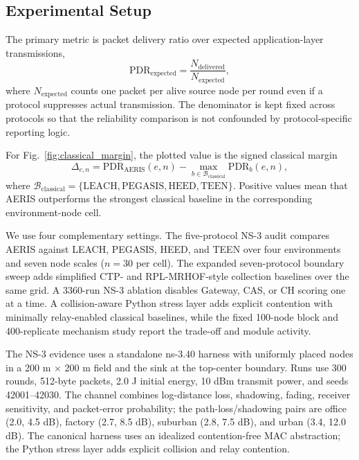 \documentclass[conference]{IEEEtran}
\begin{document}
\subsection{Experimental Setup}
The primary metric is packet delivery ratio over expected application-layer transmissions,
\begin{equation}
\mathrm{PDR}_{\mathrm{expected}}=\frac{N_{\mathrm{delivered}}}{N_{\mathrm{expected}}},
\end{equation}
where $N_{\mathrm{expected}}$ counts one packet per alive source node per round even if a protocol suppresses actual transmission. The denominator is kept fixed across protocols so that the reliability comparison is not confounded by protocol-specific reporting logic.

For Fig.~\ref{fig:classical_margin}, the plotted value is the signed classical margin
\begin{equation}
\Delta_{e,n}=\mathrm{PDR}_{\mathrm{AERIS}}(e,n)-\max_{b\in\mathcal{B}_{\mathrm{classical}}}\mathrm{PDR}_b(e,n),
\end{equation}
where $\mathcal{B}_{\mathrm{classical}}=\{\mathrm{LEACH},\mathrm{PEGASIS},\mathrm{HEED},\mathrm{TEEN}\}$. Positive values mean that AERIS outperforms the strongest classical baseline in the corresponding environment-node cell.

We use four complementary settings. The five-protocol NS-3 audit compares AERIS against LEACH, PEGASIS, HEED, and TEEN over four environments and seven node scales ($n=30$ per cell). The expanded seven-protocol boundary sweep adds simplified CTP- and RPL-MRHOF-style collection baselines over the same grid. A 3360-run NS-3 ablation disables Gateway, CAS, or CH scoring one at a time. A collision-aware Python stress layer adds explicit contention with minimally relay-enabled classical baselines, while the fixed 100-node block and 400-replicate mechanism study report the trade-off and module activity.

The NS-3 evidence uses a standalone ns-3.40 harness with uniformly placed nodes in a 200 m $\times$ 200 m field and the sink at the top-center boundary. Runs use 300 rounds, 512-byte packets, 2.0 J initial energy, 10 dBm transmit power, and seeds 42001--42030. The channel combines log-distance loss, shadowing, fading, receiver sensitivity, and packet-error probability; the path-loss/shadowing pairs are office (2.0, 4.5 dB), factory (2.7, 8.5 dB), suburban (2.8, 7.5 dB), and urban (3.4, 12.0 dB). The canonical harness uses an idealized contention-free MAC abstraction; the Python stress layer adds explicit collision and relay contention.
\end{document}
